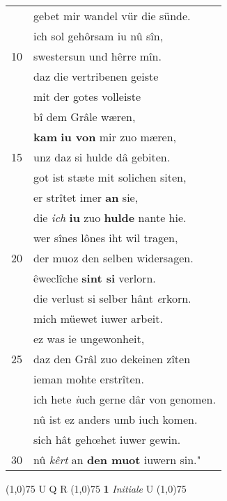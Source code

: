 \documentclass[8pt,a4paper,notitlepage]{article}
\begin{document}
\begin{table}[ht]
\begin{minipage}[t]{0.5\linewidth}
\begin{tabular}{rl}
 & gebet mir wandel vür die sünde.\\ 
 & ich sol gehôrsam iu nû sîn,\\ 
10 & swestersun und hêrre mîn.\\ 
 & daz die vertribenen geiste\\ 
 & mit der gotes volleiste\\ 
 & bî dem Grâle wæren,\\ 
 & \textbf{kam} \textbf{iu von} mir zuo mæren,\\ 
15 & unz daz si hulde dâ gebiten.\\ 
 & got ist stæte mit solichen siten,\\ 
 & er strîtet imer \textbf{an} sie,\\ 
 & die \textit{ich} \textbf{iu} zuo \textbf{hulde} nante hie.\\ 
 & wer sînes lônes iht wil tragen,\\ 
20 & der muoz den selben widersagen.\\ 
 & êweclîche \textbf{sint si} verlorn.\\ 
 & die verlust si selber hânt \textit{e}rkorn.\\ 
 & mich müewet iuwer arbeit.\\ 
 & ez was ie ungewonheit,\\ 
25 & daz den Grâl zuo dekeinen zîten\\ 
 & ieman mohte erstrîten.\\ 
 & ich hete \textit{i}uch gerne dâr von genomen.\\ 
 & nû ist ez anders umb iuch komen.\\ 
 & sich hât gehœhet iuwer gewin.\\ 
30 & nû \textit{kêrt} an \textbf{den muot} iuwern sin."\\ 
\end{tabular}
\scriptsize
\line(1,0){75} \newline
U Q R \newline
\line(1,0){75} \newline
\textbf{1} \textit{Initiale} U  \newline
\line(1,0){75} \newline

\end{minipage}
\end{table}
\end{document}
